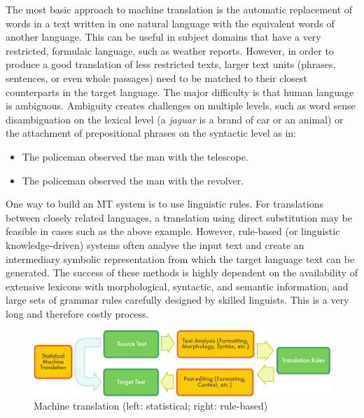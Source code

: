 \documentclass[]{../../metanetpaper}
\begin{document}
\begin{multicols}{2}

The most basic approach to machine translation is the automatic replacement of words in a text written in one natural language with the equivalent words of another language. This can be useful in subject domains that have a very restricted, formulaic language, such as weather reports. However, in order to produce a good translation of less restricted texts, larger text units (phrases, sentences, or even whole passages) need to be matched to their closest counterparts in the target language. The major difficulty is that human language is ambiguous. Ambiguity creates challenges on multiple levels, such as word sense disambiguation on the lexical level (a \textit{jaguar} is a brand of car or an animal) or the attachment of prepositional phrases on the syntactic level as in:

\begin{itemize}
\item The policeman observed the man with the telescope.
\item The policeman observed the man with the revolver.
\end{itemize}

One way to build an MT system is to use linguistic rules. For translations between closely related languages, a translation using direct substitution may be feasible in cases such as the above example. However, rule-based (or linguistic knowledge-driven) systems often analyse the input text and create an intermediary symbolic representation from which the target language text can be generated. The success of these methods is highly dependent on the availability of extensive lexicons with morphological, syntactic, and semantic information, and large sets of grammar rules carefully designed by skilled linguists. This is a very long and therefore costly process.

\begin{figure}[htb]
  \center
  \includegraphics[width=\textwidth]{../_media/english/machine_translation}
  \caption{Machine translation (left: statistical; right: rule-based)}
  \label{fig:mtarch_en}
\end{figure}
 

\end{multicols}
\end{document}
